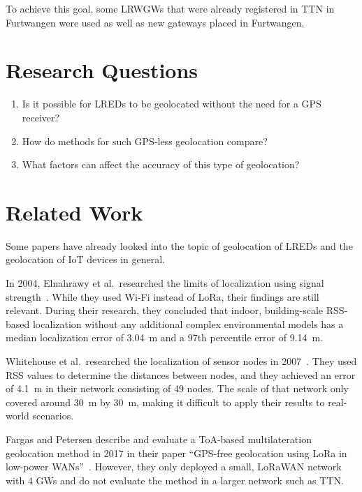 To achieve this goal, some \aclp{LRWGW} that were already registered in \acf{TTN} in Furtwangen were used as well as new gateways placed in Furtwangen.

\section{Research Questions}\label{sec:introduction-research-questions}

\begin{enumerate}
      \item Is it possible for \aclp{LRED} to be geolocated without the need for a \ac{GPS} receiver?
      \item How do methods for such \ac{GPS}-less geolocation compare?
      \item What factors can affect the accuracy of this type of geolocation?
\end{enumerate}

\section{Related Work}\label{sec:related-work}

Some papers have already looked into the topic of geolocation of \aclp{LRED} and the geolocation of \ac{IoT} devices in general.

In 2004, Elnahrawy et al.\ researched the limits of localization using signal strength~\cite{elnahrawy_limits_2004}.
While they used Wi-Fi instead of \ac{LoRa}, their findings are still relevant.
During their research, they concluded that indoor, building-scale \ac{RSS}-based localization without any additional complex environmental models has a median localization error of \SI{3.04}{\meter} and a 97th percentile error of \SI{9.14}{\meter}.

Whitehouse et al.\ researched the localization of sensor nodes in 2007~\cite{whitehouse_practical_2007}.
They used \ac{RSS} values to determine the distances between nodes, and they achieved an error of \SI{4.1}{\meter} in their network consisting of 49 nodes.
The scale of that network only covered around \SI{30}{\meter} by \SI{30}{\meter}, making it difficult to apply their results to real-world scenarios.

Fargas and Petersen describe and evaluate a \ac{ToA}-based multilateration geolocation method in 2017 in their paper ``\acs{GPS}-free geolocation using \acs{LoRa} in low-power \acsp{WAN}''~\cite{fargas_gps-free_2017}.
However, they only deployed a small, \ac{LoRaWAN} network with 4 \aclp{GW} and do not evaluate the method in a larger network such as \ac{TTN}.

